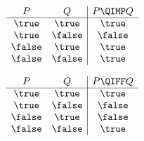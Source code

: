 \documentclass[handout]{mcs}
\begin{document}
\[
\begin{array}{cc|c}
    P  &   Q    & P \QIMP Q \\ \hline
\true  & \true  & \true \\
\true  & \false & \false \\
\false & \true  & \true \\
\false & \false & \true  
\end{array}
\]

\[
\begin{array}{cc|c}
P & Q & P \QIFF Q \\ \hline
\true & \true & \true \\
\true & \false & \false \\
\false & \true & \false \\
\false & \false & \true
\end{array}
\]
\fi
\end{document}

